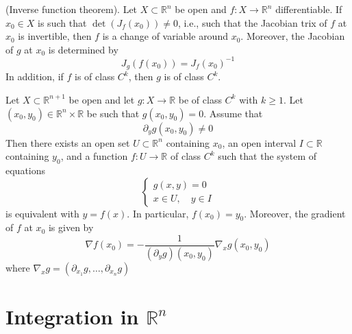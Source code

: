 \documentclass[10pt,landscape, a4paper]{article}
\newcommand{\custombox}[3]{\begin{tcolorbox}[left=0mm,right=0mm,bottom=0mm,top=0mm,title = \textbf{#1}, colback=#2!10!white, colframe = #2!70!white, coltitle=white, breakable]
    #3
    \end{tcolorbox}}
\newcommand{\theorem}[2]{\custombox{Theorem #1}{violet}{#2}}
\newcommand{\R}{\mathbb{R}}
\newcommand{\Rn}{\R^n}
\begin{document}
\begin{multicols*}{3}
    \theorem{3.10.2 (Inverse funtion theorem)} {
    (Inverse function theorem). Let $X \subset \Rn$ be open and $f: X \rightarrow \Rn$
    differentiable. If $x_{0} \in X$ is such that $\operatorname{det}\left(J_{f}\left(x_{0}\right)\right) \neq 0$, i.e., such that the Jacobian
    trix of $f$ at $x_{0}$ is invertible, then $f$ is a change of variable around $x_{0}$. Moreover, the Jacobian of $g$ at $x_{0}$ is determined by
    $$
        J_{g}\left(f\left(x_{0}\right)\right)=J_{f}\left(x_{0}\right)^{-1}
    $$
    In addition, if $f$ is of class $C^k$, then $g$ is of class $C^k$.
    }

    \theorem{3.10.4 (Implicit Function Theorem).}{Let $X \subset \R^{n+1}$ be open and let $g: X \rightarrow \R$ be of class $C^{k}$ with $k \geqslant 1$. Let $\left(x_{0}, y_{0}\right) \in \Rn \times \R$ be such that $g\left(x_{0}, y_{0}\right)=0$. Assume that
    $$
        \partial_{y} g\left(x_{0}, y_{0}\right) \neq 0
    $$
    Then there exists an open set $U \subset \Rn$ containing $x_{0}$, an open interval $I \subset \R$ containing $y_{0}$, and a function $f: U \rightarrow \R$ of class $C^{k}$ such that the system of equations
    $$
        \left\{\begin{array}{l}
            g(x, y)=0 \\
            x \in U, \quad y \in I
        \end{array}\right.
    $$
    is equivalent with $y=f(x)$. In particular, $f\left(x_{0}\right)=y_{0}$. Moreover, the gradient of $f$ at $x_{0}$ is given by
    $$
        \nabla f\left(x_{0}\right)=-\frac{1}{\left(\partial_{y} g\right)\left(x_{0}, y_{0}\right)} \nabla_{x} g\left(x_{0}, y_{0}\right)
    $$
    where $\nabla_{x} g=\left(\partial_{x_{1}} g, \ldots, \partial_{x_{n}} g\right)$}

    \section{Integration in $\Rn$}


\end{multicols*}
\end{document}
